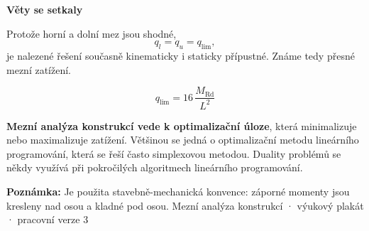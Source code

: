 \documentclass[10pt]{article}
\newcommand{\MRd}{M_{\mathrm{Rd}}}
\begin{document}
\vspace{4mm}
\begin{tcolorbox}[colback=white,colframe=gold,boxrule=1.2pt,height=30mm]
  {\Large\bfseries Věty se setkaly}\par\smallskip
  \begin{minipage}[c]{0.63\textwidth}
    Protože horní a dolní mez jsou shodné,
    \[
      q_l=q_u=q_{\mathrm{lim}},
    \]
    je nalezené řešení současně kinematicky i staticky přípustné. Známe tedy přesné mezní zatížení.
  \end{minipage}\hfill
  \begin{minipage}[c]{0.32\textwidth}
    \centering
    \begin{tcolorbox}[colback=gold!14,colframe=gold,boxrule=0.9pt]
      \[
        \boxed{q_{\mathrm{lim}}=16\,\frac{\MRd}{L^2}}
      \]
    \end{tcolorbox}
  \end{minipage}
\end{tcolorbox}

\vspace{4mm}
\begin{tcolorbox}[colback=navy!5,colframe=navy!35,height=17mm,valign=center]
	\textbf{Mezní analýza konstrukcí vede k optimalizační úloze}, která minimalizuje nebo maximalizuje zatížení. Většinou se jedná o optimalizační metodu lineárního programování, která se řeší často simplexovou metodou. Duality problémů se někdy využívá při pokročilých algoritmech lineárního programování. 
\end{tcolorbox}

\vspace{3mm}
{\small\color{muted}
\textbf{Poznámka:} Je použita stavebně-mechanická konvence: záporné momenty jsou kresleny nad osou a kladné pod osou.  
\hfill Mezní analýza konstrukcí · výukový plakát · pracovní verze 3}
\end{document}
